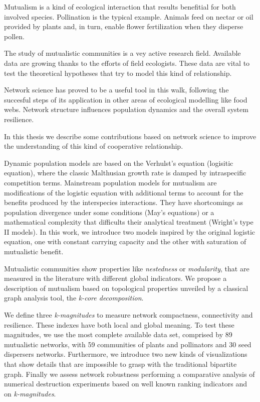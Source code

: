 \documentclass[
11pt, %
spanish, %
onehalfspacing, %
]{MastersDoctoralThesis_custom} %
\newcounter{theo}%
\begin{document}
\renewcommand{\authorshipname}{Abstract}
\begin{declaration}
\addchaptertocentry{\authorshipname}

Mutualism is a kind of ecological interaction that results benefitial for both involved species. Pollination is the typical example. Animals feed on nectar or oil provided by plants and, in turn, enable flower fertilization when they disperse pollen.   

The study of mutualistic communities is a vey active research field. Available data are growing thanks to the efforts of field ecologists. These data are vital to test the theoretical hypotheses that try to model this kind of relationship.

Network science has proved to be a useful tool in this walk, following the succesful steps of its application in other areas of ecological modelling like food webs. Network structure influences population dynamics and the overall system resilience. 

In this thesis we describe some contributions based on network science to improve the understanding of this kind of cooperative relationship. 

Dynamic population models are based on the Verhulst’s equation (logisitic equation), where the classic Malthusian growth rate is damped by intraspecific competition terms. Mainstream population models for mutualism are modifications of the logistic equation with additional terms to account for the benefits produced by the interspecies interactions. They have shortcomings as population divergence under some conditions (May’s equations) or a mathematical complexity that difficults their analytical treatment
(Wright’s type II models). In this work, we introduce two models inspired by the original logistic equation, one with constant carrying capacity and the other with saturation of mutualistic benefit.

Mutualistic communities show properties like \textit{nestedness} or \textit{modularity}, that are measured in the literature with different global indicators. We propose a description of mutualism based on topological properties unveiled by a classical graph analysis tool, the \textit{k-core decomposition}.

We define three \textit{k-magnitudes} to measure network compactness, connectivity and resilience. These indexes have both local and global meaning. To test these magnitudes, we use the most complete
available data set, comprised by 89 mutualistic networks, with 59 communities of plants
and pollinators and 30 seed dispersers networks. Furthermore, we introduce two
new kinds of visualizations that show details that are impossible to grasp with
the traditional bipartite graph. Finally we assess network robustness performing a comparative analysis of numerical destruction experiments based on well known ranking indicators and on \textit{k-magnitudes}.

\end{declaration}
\end{document}

